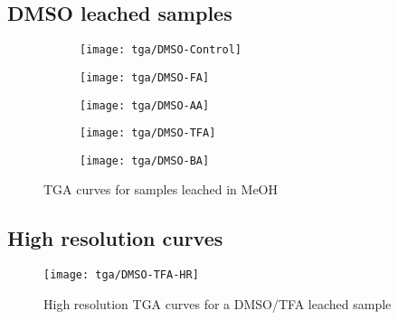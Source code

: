 \subsection{DMSO leached samples}
\begin{figure}[!h]
    \centering

    \begin{subfigure}{0.4\linewidth}
        \texttt{[image: tga/DMSO-Control]}%
        \label{appx:def:fgr:tga-dmso-cont}
    \end{subfigure}

    \begin{subfigure}{0.4\linewidth}
        \texttt{[image: tga/DMSO-FA]}%
        \label{appx:def:fgr:tga-dmso-fa}
    \end{subfigure}
    \begin{subfigure}{0.4\linewidth}
        \texttt{[image: tga/DMSO-AA]}%
        \label{appx:def:fgr:tga-dmso-aa}
    \end{subfigure}

    \begin{subfigure}{0.4\linewidth}
        \texttt{[image: tga/DMSO-TFA]}%
        \label{appx:def:fgr:tga-dmso-tfa}
    \end{subfigure}
    \begin{subfigure}{0.4\linewidth}
        \texttt{[image: tga/DMSO-BA]}%
        \label{appx:def:fgr:tga-dmso-ba}
    \end{subfigure}

    \caption{TGA curves for samples leached in MeOH}%
\end{figure}

\FloatBarrier%
\pagebreak
\subsection{High resolution curves}

\begin{figure}[!h]

    \centering

    \texttt{[image: tga/DMSO-TFA-HR]}%
    \caption{High resolution TGA curves for a DMSO/TFA leached sample}%
    \label{appx:def:fgr:tga-dmso-tfa-hr}
\end{figure}